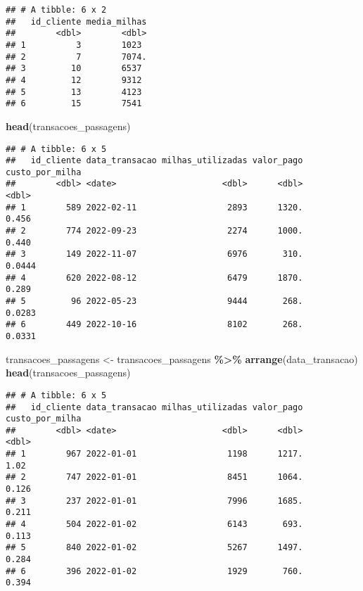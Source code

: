 \documentclass[
]{article}
\newenvironment{Shaded}{\begin{snugshade}}{\end{snugshade}}
\newcommand{\FunctionTok}[1]{\textcolor[rgb]{0.13,0.29,0.53}{\textbf{#1}}}
\newcommand{\NormalTok}[1]{#1}
\newcommand{\OtherTok}[1]{\textcolor[rgb]{0.56,0.35,0.01}{#1}}
\newcommand{\SpecialCharTok}[1]{\textcolor[rgb]{0.81,0.36,0.00}{\textbf{#1}}}
\begin{document}
\begin{verbatim}
## # A tibble: 6 x 2
##   id_cliente media_milhas
##        <dbl>        <dbl>
## 1          3        1023 
## 2          7        7074.
## 3         10        6537 
## 4         12        9312 
## 5         13        4123 
## 6         15        7541
\end{verbatim}

\begin{Shaded}
\begin{Highlighting}[]
\FunctionTok{head}\NormalTok{(transacoes\_passagens)}
\end{Highlighting}
\end{Shaded}

\begin{verbatim}
## # A tibble: 6 x 5
##   id_cliente data_transacao milhas_utilizadas valor_pago custo_por_milha
##        <dbl> <date>                     <dbl>      <dbl>           <dbl>
## 1        589 2022-02-11                  2893      1320.          0.456 
## 2        774 2022-09-23                  2274      1000.          0.440 
## 3        149 2022-11-07                  6976       310.          0.0444
## 4        620 2022-08-12                  6479      1870.          0.289 
## 5         96 2022-05-23                  9444       268.          0.0283
## 6        449 2022-10-16                  8102       268.          0.0331
\end{verbatim}

\begin{Shaded}
\begin{Highlighting}[]
\NormalTok{transacoes\_passagens }\OtherTok{\textless{}{-}}\NormalTok{ transacoes\_passagens }\SpecialCharTok{\%\textgreater{}\%} \FunctionTok{arrange}\NormalTok{(data\_transacao)}
\FunctionTok{head}\NormalTok{(transacoes\_passagens)}
\end{Highlighting}
\end{Shaded}

\begin{verbatim}
## # A tibble: 6 x 5
##   id_cliente data_transacao milhas_utilizadas valor_pago custo_por_milha
##        <dbl> <date>                     <dbl>      <dbl>           <dbl>
## 1        967 2022-01-01                  1198      1217.           1.02 
## 2        747 2022-01-01                  8451      1064.           0.126
## 3        237 2022-01-01                  7996      1685.           0.211
## 4        504 2022-01-02                  6143       693.           0.113
## 5        840 2022-01-02                  5267      1497.           0.284
## 6        396 2022-01-02                  1929       760.           0.394
\end{verbatim}
\end{document}
